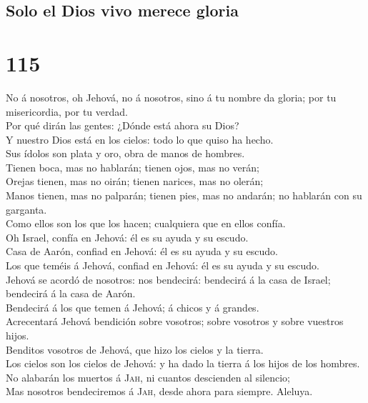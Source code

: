 \hypertarget{solo-el-dios-vivo-merece-gloria}{%
\subsection{Solo el Dios vivo merece
gloria}\label{solo-el-dios-vivo-merece-gloria}}

\hypertarget{section-19-115}{%
\section{115}\label{section-19-115}}

 No á nosotros, oh Jehová, no á nosotros, sino á tu nombre
da gloria; por tu misericordia, por tu verdad.\\
 Por qué dirán las gentes: ¿Dónde está ahora su Dios?\\
 Y nuestro Dios está en los cielos: todo lo que quiso ha
hecho.\\
 Sus ídolos son plata y oro, obra de manos de hombres.\\
 Tienen boca, mas no hablarán; tienen ojos, mas no
verán;\\
 Orejas tienen, mas no oirán; tienen narices, mas no
olerán;\\
 Manos tienen, mas no palparán; tienen pies, mas no
andarán; no hablarán con su garganta.\\
 Como ellos son los que los hacen; cualquiera que en ellos
confía.\\
 Oh Israel, confía en Jehová: él es su ayuda y su
escudo.\\
 Casa de Aarón, confiad en Jehová: él es su ayuda y su
escudo.\\
 Los que teméis á Jehová, confiad en Jehová: él es su
ayuda y su escudo.\\
 Jehová se acordó de nosotros: nos bendecirá: bendecirá á
la casa de Israel; bendecirá á la casa de Aarón.\\
 Bendecirá á los que temen á Jehová; á chicos y á
grandes.\\
 Acrecentará Jehová bendición sobre vosotros; sobre
vosotros y sobre vuestros hijos.\\
 Benditos vosotros de Jehová, que hizo los cielos y la
tierra.\\
 Los cielos son los cielos de Jehová: y ha dado la tierra
á los hijos de los hombres.\\
 No alabarán los muertos á \textsc{Jah}, ni cuantos
descienden al silencio;\\
 Mas nosotros bendeciremos á \textsc{Jah}, desde ahora
para siempre. Aleluya.

